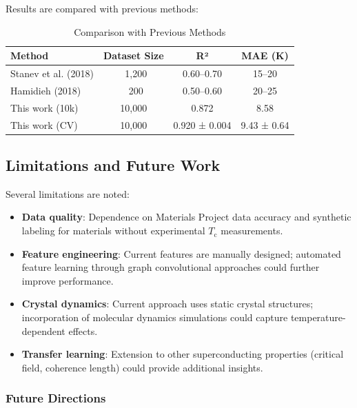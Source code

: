 \documentclass[11pt,a4paper]{article}
\begin{document}
Results are compared with previous methods:

\begin{table}[H]
\centering
\caption{Comparison with Previous Methods}
\begin{tabular}{@{}lccc@{}}
\toprule
\textbf{Method} & \textbf{Dataset Size} & \textbf{R²} & \textbf{MAE (\si{\kelvin})} \\
\midrule
Stanev et al. (2018) & ~1,200 & 0.60--0.70 & 15--20 \\
Hamidieh (2018) & ~200 & 0.50--0.60 & 20--25 \\
This work (10k) & 10,000 & 0.872 & 8.58 \\
This work (CV) & 10,000 & 0.920 ± 0.004 & 9.43 ± 0.64 \\
\bottomrule
\end{tabular}
\end{table}

\subsection{Limitations and Future Work}

Several limitations are noted:

\begin{itemize}
    \item \textbf{Data quality}: Dependence on Materials Project data accuracy and synthetic labeling for materials without experimental $T_{\text{c}}$ measurements.
    
    \item \textbf{Feature engineering}: Current features are manually designed; automated feature learning through graph convolutional approaches could further improve performance.
    
    \item \textbf{Crystal dynamics}: Current approach uses static crystal structures; incorporation of molecular dynamics simulations could capture temperature-dependent effects.
    
    \item \textbf{Transfer learning}: Extension to other superconducting properties (critical field, coherence length) could provide additional insights.
\end{itemize}

\subsubsection{Future Directions}
\end{document}
